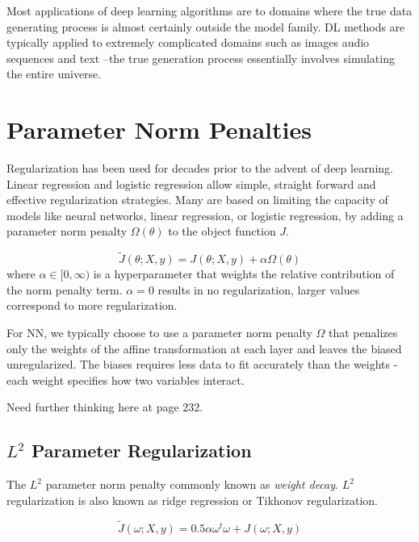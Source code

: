 \documentclass{article}
\begin{document}
Most applications of deep learning algorithms are to domains where the true data generating process is almost certainly outside the model family.
DL methods are typically applied to extremely complicated domains such as images audio sequences and text --the true generation process essentially involves simulating the entire universe.

 

\section{Parameter Norm Penalties}
Regularization has been used for decades prior to the advent of deep learning.
Linear regression and logistic regression allow simple, straight forward and effective regularization strategies.
Many are based on limiting the capacity of models like neural networks, linear regression, or logistic regression, by adding a parameter norm penalty $\Omega(\theta)$ to the object function $J$.

\begin{equation}
\tilde{J}(\theta; X, y) = J(\theta;X, y) + \alpha\Omega(\theta)
\end{equation}
where $\alpha \in [0, \infty) $ is a hyperparameter that weights the relative contribution of the norm penalty term.
$\alpha = 0$ results in no regularization, larger values correspond to more regularization.

For NN, we typically choose to use a parameter norm penalty $\Omega$ that penalizes only the weights of the affine transformation at each layer and leaves the biased unregularized. The biases requires less data to fit accurately than the weights - each weight specifies how two variables interact.

Need further thinking here at page 232.

\subsection{$L^2$ Parameter Regularization}
The $L^2$ parameter norm penalty commonly known as \textit{weight decay}. $L^2$ regularization is also known as ridge regression or Tikhonov regularization.


\begin{equation}
\tilde{J}(\omega; X, y) = 0.5\alpha \omega^t \omega + J(\omega; X, y)
\end{equation}
\end{document}
